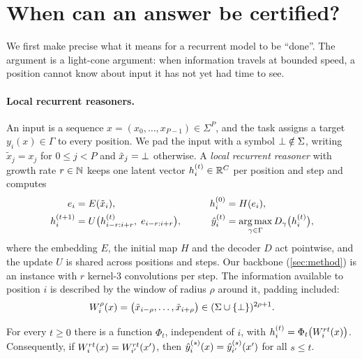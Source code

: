 \section{When can an answer be certified?}
\label{sec:theory}

We first make precise what it means for a recurrent model to be ``done''. The argument is a light-cone
argument: when information travels at bounded speed, a position cannot know about input it has not yet
had time to see.

\paragraph{Local recurrent reasoners.}
An input is a sequence $x = (x_0,\dots,x_{P-1})\in\Sigma^P$, and the task assigns a target
$y_i(x)\in\Gamma$ to every position. We pad the input with a symbol $\bot\notin\Sigma$, writing
$\tilde x_j = x_j$ for $0\le j<P$ and $\tilde x_j=\bot$ otherwise. A \emph{local recurrent reasoner}
with growth rate $r\in\mathbb{N}$ keeps one latent vector $h_i^{(t)}\in\mathbb{R}^C$ per position and step and computes
\begin{equation}
  \begin{aligned}
    e_i &= E(\tilde x_i), &\qquad h_i^{(0)} &= H(e_i),\\
    h_i^{(t+1)} &= U\bigl(h^{(t)}_{i-r:i+r},\; e_{i-r:i+r}\bigr), &\qquad
    \hat{y}_i^{(t)} &= \operatorname*{arg\,max}_{\gamma\in\Gamma} D_\gamma\bigl(h_i^{(t)}\bigr),
  \end{aligned}
  \label{eq:local}
\end{equation}
where the embedding $E$, the initial map $H$ and the decoder $D$ act pointwise, and the update $U$ is
shared across positions and steps. Our backbone (\cref{sec:method}) is an instance with $r$ kernel-3
convolutions per step. The information available to position $i$ is described by the window of radius
$\rho$ around it, padding included:
\begin{equation}
  W_{i}^{\rho}(x) = \bigl(\tilde x_{i-\rho},\dots,\tilde x_{i+\rho}\bigr)\in(\Sigma\cup\{\bot\})^{2\rho+1}.
  \label{eq:window}
\end{equation}

\begin{lemma}\label{lem:cone}
For every $t\ge 0$ there is a function $\Phi_t$, independent of $i$, with
$h_i^{(t)} = \Phi_t\bigl(W_{i}^{rt}(x)\bigr)$. Consequently, if $W_{i}^{rt}(x) = W_{i'}^{rt}(x')$,
then $\hat{y}_i^{(s)}(x) = \hat{y}_{i'}^{(s)}(x')$ for all $s\le t$.
\end{lemma}

